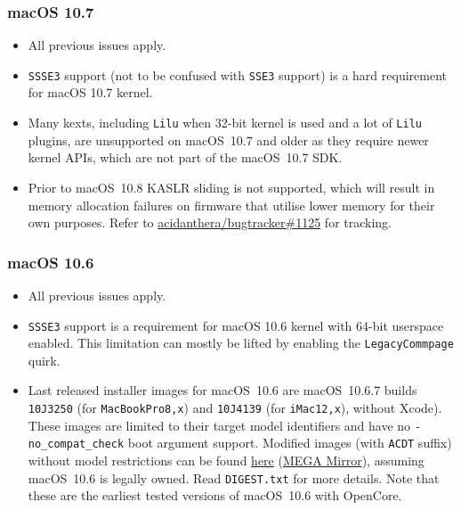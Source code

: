\documentclass[]{article}
\makeatletter
\renewcommand{\label}[1]{%
\zref@wrapper@immediate{\oldlabel{#1}}}  %
\makeatother
\begin{document}
\subsubsection{macOS 10.7}\label{legacy107}

\begin{itemize}
  \item All previous issues apply.
  \item \texttt{SSSE3} support (not to be confused with \texttt{SSE3} support)
    is a hard requirement for macOS 10.7 kernel.
  \item Many kexts, including \texttt{Lilu} when 32-bit kernel
    is used and a lot of \texttt{Lilu} plugins, are
    unsupported on macOS~10.7 and older as they require newer
    kernel APIs, which are not part of the macOS~10.7 SDK.
  \item Prior to macOS~10.8 KASLR sliding is not supported, which
    will result in memory allocation failures on firmware
    that utilise lower memory for their own purposes. Refer to
    \href{https://github.com/acidanthera/bugtracker/issues/1125}{acidanthera/bugtracker\#1125}
    for tracking.
\end{itemize}

\subsubsection{macOS 10.6}\label{legacy106}

\begin{itemize}
  \item All previous issues apply.
  \item \texttt{SSSE3} support is a requirement for macOS 10.6 kernel
    with 64-bit userspace enabled. This limitation can mostly be lifted
    by enabling the \texttt{LegacyCommpage} quirk.
  \item Last released installer images for macOS~10.6 are macOS~10.6.7
    builds \texttt{10J3250} (for \texttt{MacBookPro8,x}) and
    \texttt{10J4139} (for \texttt{iMac12,x}), without Xcode). These
    images are limited to their target model identifiers and have no
    \texttt{-no\_compat\_check} boot argument support. Modified images
    (with \texttt{ACDT} suffix) without model restrictions can be found
    \href{https://archive.org/details/10.6.7-10j3250-disk-images}{here}
    (\href{https://mega.nz/folder/z5YUhYTb#gA\_IRY5KMuYpnNCg7kR3ug}{MEGA Mirror}),
    assuming macOS~10.6 is legally owned. Read \texttt{DIGEST.txt}
    for more details. Note that these are the earliest tested
    versions of macOS~10.6 with OpenCore.
\end{itemize}
\end{document}
